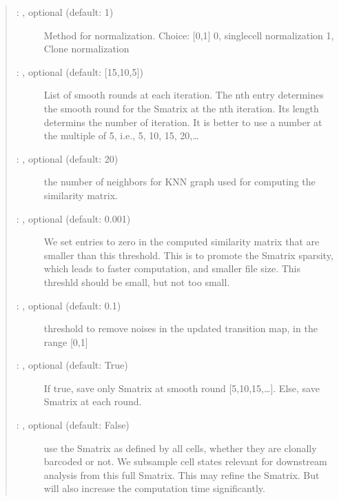 \documentclass[letterpaper,10pt,english]{sphinxmanual}
\begin{document}
\begin{fulllineitems}
\begin{quote}
\begin{description}
\begin{description}
\item[{ : , optional (default: 1)}] \leavevmode
Method for normalization. Choice: {[}0,1{]}
0, single\sphinxhyphen{}cell normalization
1, Clone normalization

\item[{ : , optional (default: {[}15,10,5{]})}] \leavevmode
List of smooth rounds at each iteration.
The n\sphinxhyphen{}th entry determines the smooth round for the Smatrix
at the n\sphinxhyphen{}th iteration. Its length determins the number of
iteration. It is better to use a number at the multiple of
5, i.e., 5, 10, 15, 20,…

\item[{ : , optional (default: 20)}] \leavevmode
the number of neighbors for KNN graph used for computing the similarity matrix.

\item[{ : , optional (default: 0.001)}] \leavevmode
We set entries to zero in the computed similarity matrix that
are smaller than this threshold. This is to promote the Smatrix sparsity, which
leads to faster computation, and smaller file size.
This threshld should be small, but not too small.

\item[{ : , optional (default: 0.1)}] \leavevmode
threshold to remove noises in the updated transition map,
in the range {[}0,1{]}

\item[{ : , optional (default: True)}] \leavevmode
If true, save only Smatrix at smooth round {[}5,10,15,…{]}.
Else, save Smatrix at each round.

\item[{ : , optional (default: False)}] \leavevmode
use the Smatrix as defined by all cells, whether they are clonally
barcoded or not. We sub\sphinxhyphen{}sample cell states relevant for downstream
analysis from this full Smatrix. This may refine the Smatrix.
But will also increase the computation time significantly.


\end{description}
\end{description}
\end{quote}
\end{fulllineitems}
\end{document}
